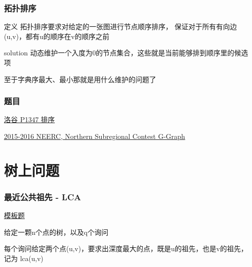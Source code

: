 \documentclass{beamer}
\begin{document}

  \begin{frame}
    \frametitle{拓扑排序}
    \begin{block}{定义}
      拓扑排序要求对给定的一张图进行节点顺序排序，
      保证对于所有有向边(u,v)，都有u的顺序在v的顺序之前
    \end{block}

    \pause
    
    \begin{block}{solution}
      动态维护一个入度为0的节点集合，这些就是当前能够排到顺序里的候选项
    \end{block}
    
    \pause

    至于字典序最大、最小那就是用什么维护的问题了

  \end{frame}

  \begin{frame}
    \frametitle{题目}
    \href{https://www.luogu.com.cn/problem/P1347}{洛谷 P1347 排序}

    \href{https://codeforces.com/gym/100801}{2015-2016 NEERC, Northern Subregional Contest G-Graph}
  \end{frame}

  \section{树上问题}

  \begin{frame}
    \frametitle{最近公共祖先 - LCA}
    \href{https://www.luogu.com.cn/problem/P3379}{模板题}

    \vspace*{1\baselineskip}
    
    给定一颗n个点的树，以及q个询问

    \vspace*{1\baselineskip}

    每个询问给定两个点(u,v)，要求出深度最大的点，既是u的祖先，也是v的祖先，记为
    lca(u,v)
  \end{frame}
\end{document}
